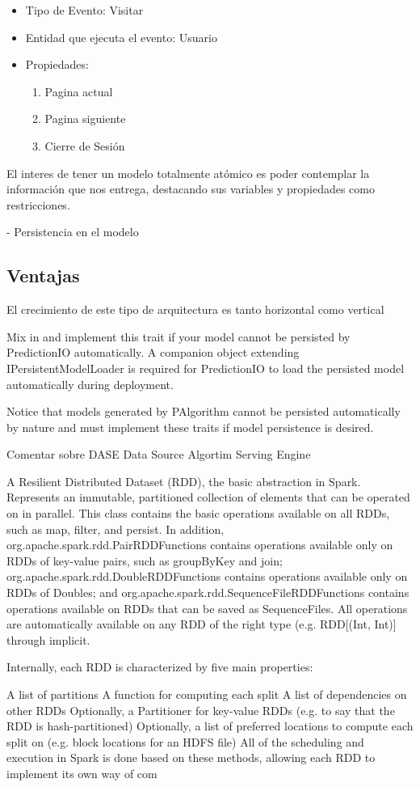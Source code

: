     \begin{itemize}
      \item Tipo de Evento: Visitar
      \item Entidad que ejecuta el evento: Usuario
      \item Propiedades:
          \begin{enumerate}
            \item Pagina actual
            \item Pagina siguiente
            \item Cierre de Sesión
          \end{enumerate}
    \end{itemize}



    El interes de tener un modelo totalmente atómico es poder contemplar la información que nos entrega, destacando sus variables y propiedades como restricciones.


    - Persistencia en el modelo


  \subsection{Ventajas }

El crecimiento de este tipo de arquitectura es tanto horizontal como vertical


  Mix in and implement this trait if your model cannot be persisted by PredictionIO automatically. A companion object extending IPersistentModelLoader is required for PredictionIO to load the persisted model automatically during deployment.

Notice that models generated by PAlgorithm cannot be persisted automatically by nature and must implement these traits if model persistence is desired.



Comentar sobre DASE
Data Source
Algortim
Serving
Engine


A Resilient Distributed Dataset (RDD), the basic abstraction in Spark. Represents an immutable, partitioned collection of elements that can be operated on in parallel. This class contains the basic operations available on all RDDs, such as map, filter, and persist. In addition, org.apache.spark.rdd.PairRDDFunctions contains operations available only on RDDs of key-value pairs, such as groupByKey and join; org.apache.spark.rdd.DoubleRDDFunctions contains operations available only on RDDs of Doubles; and org.apache.spark.rdd.SequenceFileRDDFunctions contains operations available on RDDs that can be saved as SequenceFiles. All operations are automatically available on any RDD of the right type (e.g. RDD[(Int, Int)] through implicit.

Internally, each RDD is characterized by five main properties:

A list of partitions
A function for computing each split
A list of dependencies on other RDDs
Optionally, a Partitioner for key-value RDDs (e.g. to say that the RDD is hash-partitioned)
Optionally, a list of preferred locations to compute each split on (e.g. block locations for an HDFS file)
All of the scheduling and execution in Spark is done based on these methods, allowing each RDD to implement its own way of com